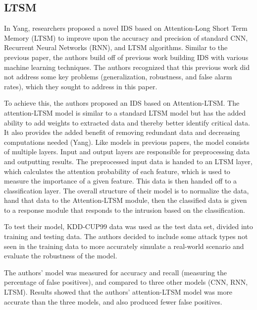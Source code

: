 \subsection{LTSM}

In Yang, researchers proposed a novel IDS based on Attention-Long Short Term Memory (LTSM) to improve upon the accuracy and precision of standard CNN, Recurrent Neural Networks (RNN), and LTSM algorithms. Similar to the previous paper, the authors build off of previous work building IDS with various machine learning techniques. The authors recognized that this previous work did not address some key problems (generalization, robustness, and false alarm rates), which they sought to address in this paper. 

To achieve this, the authors proposed an IDS based on Attention-LTSM. The attention-LTSM model is similar to a standard LTSM model but has the added ability to add weights to extracted data and thereby better identify critical data. It also provides the added benefit of removing redundant data and decreasing computations needed (Yang). Like models in previous papers, the model consists of multiple layers. Input and output layers are responsible for preprocessing data and outputting results. The preprocessed input data is handed to an LTSM layer, which calculates the attention probability of each feature, which is used to measure the importance of a given feature. This data is then handed off to a classification layer. The overall structure of their model is to normalize the data, hand that data to the Attention-LTSM module, then the classified data is given to a response module that responds to the intrusion based on the classification. 

To test their model, KDD-CUP99 data was used as the test data set, divided into training and testing data. The authors decided to include some attack types not seen in the training data to more accurately simulate a real-world scenario and evaluate the robustness of the model. 

The authors’ model was measured for accuracy and recall (measuring the percentage of false positives), and compared to three other models (CNN, RNN, LTSM). Results showed that the authors’ attention-LTSM model was more accurate than the three models, and also produced fewer false positives. 

